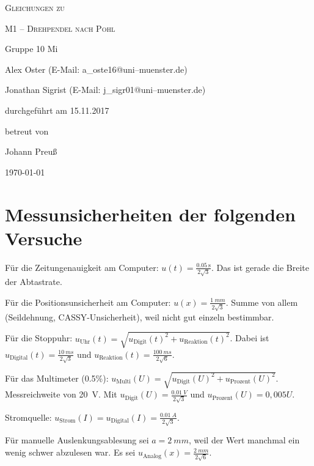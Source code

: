\documentclass[11pt,a4paper,titlepage, ngerman]{article}
\begin{document}
	\begin{titlepage}
		
		\centering
		{\scshape\LARGE Gleichungen zu \par}
		\vspace{1cm}
		{\scshape\huge M1 -- Drehpendel nach Pohl\par}
		\vspace{2.5cm}
		{\LARGE Gruppe 10 Mi\par}
		\vspace{0.5cm}
		{\large Alex Oster (E-Mail: a\_oste16@uni--muenster.de) \par}
		{\large Jonathan Sigrist (E-Mail: j\_sigr01@uni--muenster.de) \par}
		\vfill
		durchgeführt am 15.11.2017\par
		betreut von\par
		{\large Johann Preuß}		
		\vfill	
		{\large \today\par}
		
	\end{titlepage}
		
	\tableofcontents
		
	\newpage
		
	\section{Messunsicherheiten der folgenden Versuche}
		
		Für die Zeitungenauigkeit am Computer: $u(t) = \frac{\SI{0,05}{\second}}{2\sqrt{3}}$.
		Das ist gerade die Breite der Abtastrate.	
	
		Für die Positionsunsicherheit am Computer: $u(x) = \frac{\SI{1}{mm}}{2\sqrt{3}}$.
		Summe von allem (Seildehnung, CASSY-Unsicherheit), weil nicht gut einzeln bestimmbar.
		
		Für die Stoppuhr: $u_\text{Uhr}(t) = \sqrt{u_\text{Digit}(t)^2 + u_\text{Reaktion}(t)^2}$.
		Dabei ist $u_\text{Digital}(t) = \frac{\SI{10}{ms}}{2\sqrt{3}}$ und $u_\text{Reaktion}(t) = \frac{\SI{100}{ms}}{2\sqrt{6}}$.
		
		Für das Multimeter (0.5\%): $u_\text{Multi}(U) = \sqrt{u_\text{Digit}(U)^2 + u_\text{Prozent}(U)^2}$.
		Messreichweite von \SI{20}{V}.
		Mit $u_\text{Digit}(U) = \frac{\SI{0,01}{V}}{2\sqrt{3}}$ und $u_\text{Prozent}(U) = 0,005 U$.
		
		Stromquelle: $u_\text{Strom}(I) = u_\text{Digital}(I) = \frac{\SI{0,01}{A}}{2\sqrt{3}}$.
		
		Für manuelle Auslenkungsablesung sei $a = \SI{2}{mm}$, weil der Wert manchmal ein wenig schwer abzulesen war.		
		Es sei $u_\text{Analog}(x) = \frac{\SI{2}{mm}}{2\sqrt{6}}$.
	
\end{document}
